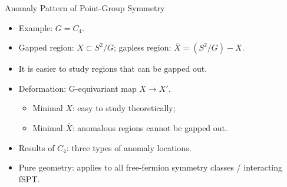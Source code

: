 \documentclass[xcolor=table, 11pt, aspectratio=169]{beamer}
\begin{document}
    \begin{frame}{Anomaly Pattern of Point-Group Symmetry}
      \begin{itemize}
        \item<1-> Example: $G=C_4$.
        \item<2-> Gapped region: $X\subset S^2/G$; gapless region: $\bar X=(S^2/G) - X$.
        \item<2-> It is easier to study regions that can be gapped out.
        \item<3-> Deformation: G-equivariant map $X\rightarrow X'$.
        \begin{itemize}
          \item<4-> Minimal $X$: easy to study theoretically;
          \item<5-> Minimal $\bar X$: anomalous regions cannot be gapped out.
        \end{itemize}
        \item<6-> Results of $C_4$: three types of anomaly locations.
        \item<7-> Pure geometry: applies to all free-fermion symmetry classes / interacting fSPT.
      \end{itemize}
      \begin{center}
        \hspace{2em}
        \begin{animateinline}{30}
        \end{animateinline}
        \hspace{4em}

\end{center}
\end{frame}
\end{document}
